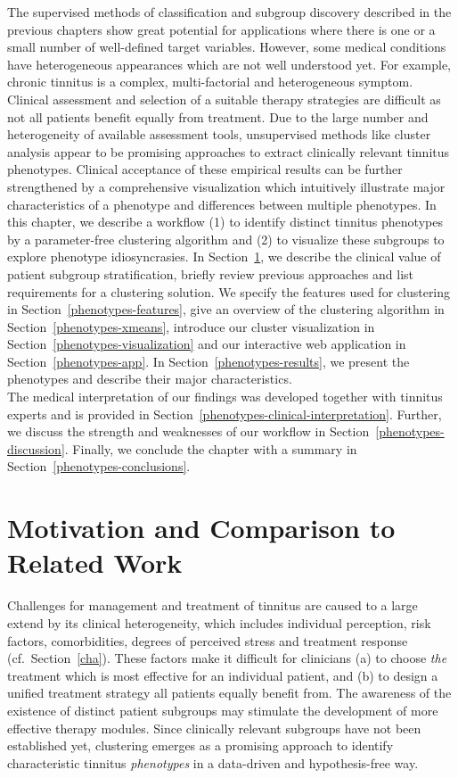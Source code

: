 \documentclass[
  oneside]{book}
\begin{document}
The supervised methods of classification and subgroup discovery described in the previous chapters show great potential for applications where there is one or a small number of well-defined target variables.
However, some medical conditions have heterogeneous appearances which are not well understood yet.
For example, chronic tinnitus is a complex, multi-factorial and heterogeneous symptom.
Clinical assessment and selection of a suitable therapy strategies are difficult as not all patients benefit equally from treatment.
Due to the large number and heterogeneity of available assessment tools, unsupervised methods like cluster analysis appear to be promising approaches to extract clinically relevant tinnitus phenotypes.
Clinical acceptance of these empirical results can be further strengthened by a comprehensive visualization which intuitively illustrate major characteristics of a phenotype and differences between multiple phenotypes.
In this chapter, we describe a workflow (1) to identify distinct tinnitus phenotypes by a parameter-free clustering algorithm and (2) to visualize these subgroups to explore phenotype idiosyncrasies.
In Section~\ref{phenotypes-motivation}, we describe the clinical value of patient subgroup stratification, briefly review previous approaches and list requirements for a clustering solution.
We specify the features used for clustering in Section~\ref{phenotypes-features}, give an overview of the clustering algorithm in Section~\ref{phenotypes-xmeans}, introduce our cluster visualization in Section~\ref{phenotypes-visualization} and our interactive web application in Section~\ref{phenotypes-app}.
In Section~\ref{phenotypes-results}, we present the phenotypes and describe their major characteristics.\\
The medical interpretation of our findings was developed together with tinnitus experts and is provided in Section~\ref{phenotypes-clinical-interpretation}.
Further, we discuss the strength and weaknesses of our workflow in Section~\ref{phenotypes-discussion}.
Finally, we conclude the chapter with a summary in Section~\ref{phenotypes-conclusions}.

\hypertarget{phenotypes-motivation}{%
\section{Motivation and Comparison to Related Work}\label{phenotypes-motivation}}

Challenges for management and treatment of tinnitus are caused to a large extend by its clinical heterogeneity, which includes individual perception, risk factors, comorbidities, degrees of perceived stress and treatment response (cf.~Section~\ref{cha}).
These factors make it difficult for clinicians (a) to choose \emph{the} treatment which is most effective for an individual patient, and (b) to design a unified treatment strategy all patients equally benefit from.
The awareness of the existence of distinct patient subgroups may stimulate the development of more effective therapy modules.
Since clinically relevant subgroups have not been established yet, clustering emerges as a promising approach to identify characteristic tinnitus \emph{phenotypes} in a data-driven and hypothesis-free way.
\end{document}
